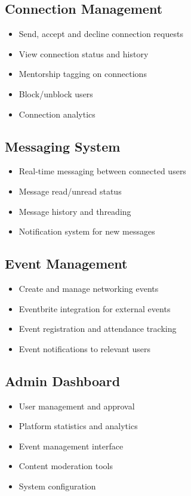 \documentclass[12pt,a4paper]{report}
\let\origsubsection\subsection
\renewcommand{\subsection}{\needspace{4\baselineskip}\origsubsection}
\begin{document}
\subsection{Connection Management}

\begin{itemize}[noitemsep]
    \item Send, accept and decline connection requests
    \item View connection status and history
    \item Mentorship tagging on connections
    \item Block/unblock users
    \item Connection analytics
\end{itemize}

\subsection{Messaging System}

\begin{itemize}[noitemsep]
    \item Real-time messaging between connected users
    \item Message read/unread status
    \item Message history and threading
    \item Notification system for new messages
\end{itemize}

\subsection{Event Management}

\begin{itemize}[noitemsep]
    \item Create and manage networking events
    \item Eventbrite integration for external events
    \item Event registration and attendance tracking
    \item Event notifications to relevant users
\end{itemize}

\subsection{Admin Dashboard}

\begin{itemize}[noitemsep]
    \item User management and approval
    \item Platform statistics and analytics
    \item Event management interface
    \item Content moderation tools
    \item System configuration
\end{itemize}
\end{document}
